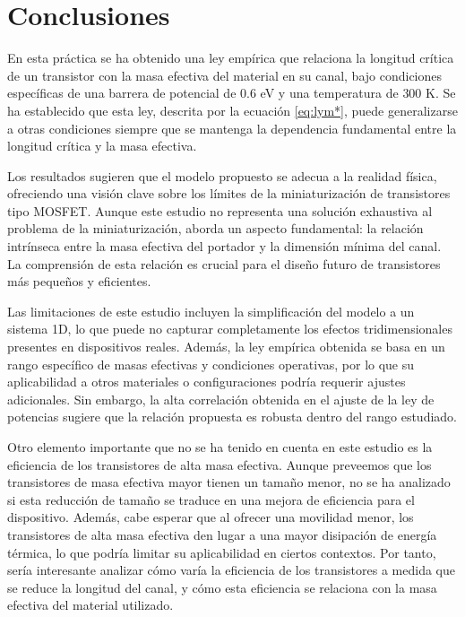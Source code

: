 
\section{Conclusiones}
En esta práctica se ha obtenido una ley empírica que relaciona la longitud crítica de un transistor con la masa efectiva del material en su canal, bajo condiciones específicas de una barrera de potencial de $0.6$ eV y una temperatura de $300$ K. Se ha establecido que esta ley, descrita por la ecuación \ref{eq:lym*}, puede generalizarse a otras condiciones siempre que se mantenga la dependencia fundamental entre la longitud crítica y la masa efectiva.

Los resultados sugieren que el modelo propuesto se adecua a la realidad física, ofreciendo una visión clave sobre los límites de la miniaturización de transistores tipo MOSFET. Aunque este estudio no representa una solución exhaustiva al problema de la miniaturización, aborda un aspecto fundamental: la relación intrínseca entre la masa efectiva del portador y la dimensión mínima del canal. La comprensión de esta relación es crucial para el diseño futuro de transistores más pequeños y eficientes.

Las limitaciones de este estudio incluyen la simplificación del modelo a un sistema 1D, lo que puede no capturar completamente los efectos tridimensionales presentes en dispositivos reales. Además, la ley empírica obtenida se basa en un rango específico de masas efectivas y condiciones operativas, por lo que su aplicabilidad a otros materiales o configuraciones podría requerir ajustes adicionales. Sin embargo, la alta correlación obtenida en el ajuste de la ley de potencias sugiere que la relación propuesta es robusta dentro del rango estudiado.

Otro elemento importante que no se ha tenido en cuenta en este estudio es la eficiencia de los transistores de alta masa efectiva. Aunque preveemos que los transistores de masa efectiva mayor tienen un tamaño menor, no se ha analizado si esta reducción de tamaño se traduce en una mejora de eficiencia para el dispositivo. Además, cabe esperar que al ofrecer una movilidad menor, los transistores de alta masa efectiva den lugar a una mayor disipación de energía térmica, lo que podría limitar su aplicabilidad en ciertos contextos. Por tanto, sería interesante analizar cómo varía la eficiencia de los transistores a medida que se reduce la longitud del canal, y cómo esta eficiencia se relaciona con la masa efectiva del material utilizado.


